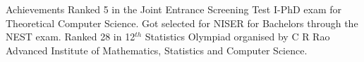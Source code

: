 \begin{rubric}{Achievements}
\entry*[2024] Ranked 5 in the Joint Entrance Screening Test I-PhD exam for Theoretical Computer Science.
\entry*[2021] Got selected for NISER for Bachelors through the NEST exam.
\entry*[2020] Ranked 28 in 12$^{th}$ Statistics Olympiad organised by C R Rao Advanced Institute of Mathematics, Statistics and Computer Science.
\end{rubric}
